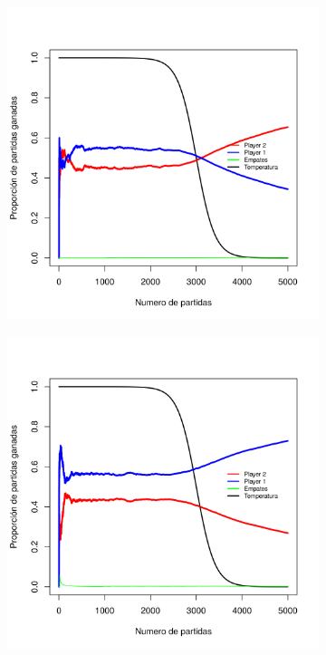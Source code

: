 \documentclass[11pt, spanish]{article}
\begin{document}
\begin{figure}[H]
    \centering
    \begin{subfigure}[b]{0.45\textwidth}
      \includegraphics[width=\textwidth]{Imagenes/SinVision_disipacion_QsinVison_reverse}
    \end{subfigure}
\end{figure}

\begin{figure}[H]
    \centering
    \begin{subfigure}[b]{0.45\textwidth}
      \includegraphics[width=\textwidth]{Imagenes/SinVision_disipacion_QconVison}
    \end{subfigure}
\end{figure}
\end{document}
